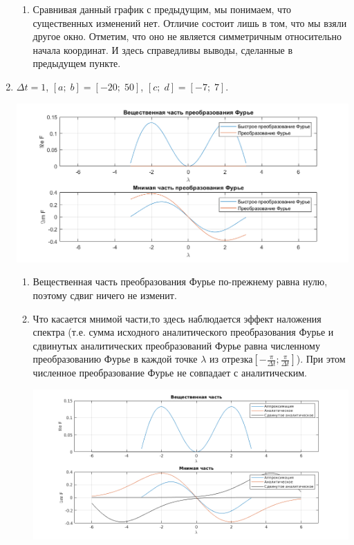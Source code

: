 \documentclass[a4paper, 11pt]{article}
\begin{document}
\begin{enumerate}
                \begin{enumerate}
                    \item
                        Сравнивая данный график с предыдущим, мы понимаем, что существенных изменений нет. Отличие состоит лишь в том, что мы взяли другое окно. Отметим, что оно не является симметричным относительно начала координат. И здесь справедливы выводы, сделанные в предыдущем пункте.
                \end{enumerate}
            
            \item
                $\Delta t = 1$, $[a;\; b] = [-20;\; 50]$, $[c;\;d] = [-7;\;7]$.
                
                \includegraphics[width=\linewidth]{img/6.png}
                
                \begin{enumerate}
                    \item
                        Вещественная часть преобразования Фурье по-прежнему равна нулю, поэтому сдвиг ничего не изменит.
                    \item
                        Что касается мнимой части,то здесь наблюдается эффект наложения спектра (т.е. сумма исходного аналитического преобразования Фурье и сдвинутых аналитических преобразований Фурье равна численному преобразованию Фурье в каждой точке $\lambda$ из отрезка$\left[-\frac{\pi}{\Delta t}; \frac{\pi} {\Delta t} \right]$). При этом численное преобразование Фурье не совпадает с аналитическим.
                        
                        \includegraphics[width=\linewidth]{img/shifted.png}


\end{enumerate}
\end{enumerate}
\end{document}
